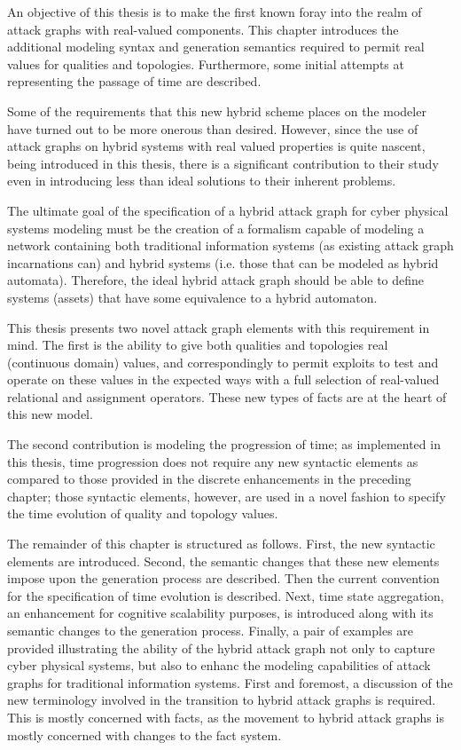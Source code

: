 An objective of this thesis is to make the first known foray into the realm of
attack graphs with real-valued components. This chapter introduces the additional
modeling syntax and generation semantics required to permit real values for
qualities and topologies. Furthermore, some initial attempts at representing
the passage of time are described. 

Some of the requirements that this new hybrid scheme places on the modeler
have turned out to be more onerous than desired. However, since the use of 
attack graphs on hybrid systems with real valued properties is quite nascent, 
being introduced in this thesis, there is a significant contribution to their
study even in introducing less than ideal solutions to their inherent problems.

The ultimate goal of the specification of a hybrid attack graph for cyber
physical systems modeling must be the creation of a formalism capable of
modeling a network containing both traditional information systems (as
existing attack graph incarnations can) and hybrid systems (i.e. those that
can be modeled as hybrid automata). Therefore, the ideal hybrid attack graph
should be able to define systems (assets) that have some equivalence to a
hybrid automaton.

This thesis presents two novel attack graph elements with this requirement
in mind. The first is the ability to give both qualities and topologies
real (continuous domain) values, and correspondingly to permit exploits to
test and operate on these values in the expected ways with a full selection of
real-valued relational and assignment operators. These new types of facts are 
at the heart of this new model. 

The second contribution is modeling the progression
of time; as implemented in this thesis, time progression does not require any
new syntactic elements as compared to those provided in the discrete 
enhancements in the preceding chapter; those syntactic elements, however, are
used in a novel fashion to specify the
time evolution of quality and topology values.

The remainder of this chapter is structured as follows. First, the new
syntactic elements are introduced. Second, the semantic changes that these new
elements impose upon the generation process are described. Then the current
convention for the specification of time evolution is described. Next, 
time state aggregation, an enhancement for cognitive scalability purposes,
is introduced along with its semantic changes to the generation process.
Finally, a pair of examples are provided illustrating the ability of the
hybrid attack graph not only to capture cyber physical systems, but also to
enhanc the modeling capabilities of attack graphs for traditional information
systems.
First and foremost, a discussion of the new terminology involved in the
transition to hybrid attack graphs is required. This is mostly concerned with
facts, as the movement to hybrid attack graphs is mostly concerned with changes
to the fact system.


